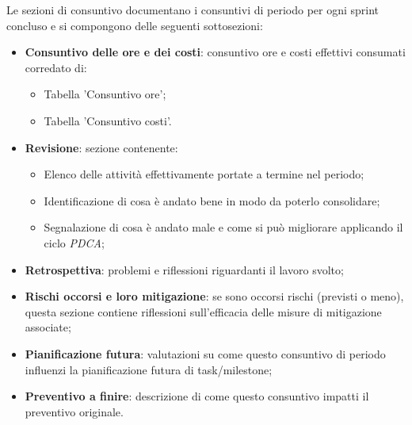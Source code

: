 \documentclass[10pt, a4paper]{article}
\begin{document}
Le sezioni di consuntivo documentano i consuntivi di periodo per ogni sprint concluso e si compongono delle seguenti sottosezioni:
\begin{itemize}
    \item \textbf{Consuntivo delle ore e  dei costi}: consuntivo ore e costi effettivi consumati corredato di:
    \begin{itemize}
        \item Tabella 'Consuntivo ore';
        \item Tabella 'Consuntivo costi'.
    \end{itemize} 
    \item \textbf{Revisione}: sezione contenente:
    \begin{itemize}
        \item Elenco delle attività effettivamente portate a termine nel periodo;
        \item Identificazione di cosa è andato bene in modo da poterlo consolidare;
        \item Segnalazione di cosa è andato male e come si può migliorare applicando il ciclo \textit{PDCA};
    \end{itemize}
    \item \textbf{Retrospettiva}: problemi e riflessioni riguardanti il lavoro svolto;
    \item \textbf{Rischi occorsi e loro mitigazione}: se sono occorsi rischi (previsti o meno), questa sezione contiene riflessioni sull'efficacia delle misure di mitigazione associate;
    \item \textbf{Pianificazione futura}: valutazioni su come questo consuntivo di periodo influenzi la pianificazione futura di task/milestone;
    \item \textbf{Preventivo a finire}: descrizione di come questo consuntivo impatti il preventivo originale.
    
\end{itemize}
\end{document}
